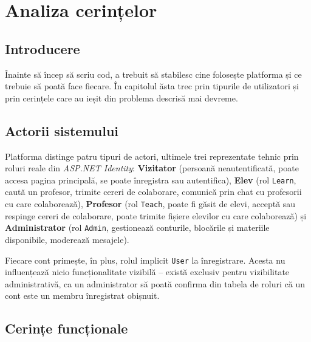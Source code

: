 \chapter{Analiza cerințelor}

\section{Introducere}

Înainte să încep să scriu cod, a trebuit să stabilesc cine folosește platforma și
ce trebuie să poată face fiecare. În capitolul ăsta trec prin tipurile de
utilizatori și prin cerințele care au ieșit din problema descrisă mai devreme.

\section{Actorii sistemului}

Platforma distinge patru tipuri de actori, ultimele trei reprezentate tehnic prin
roluri reale din \emph{ASP.NET Identity}: \textbf{Vizitator} (persoană
neautentificată, poate accesa pagina principală, se poate înregistra sau
autentifica), \textbf{Elev} (rol \texttt{Learn}, caută un profesor, trimite cereri
de colaborare, comunică prin chat cu profesorii cu care colaborează),
\textbf{Profesor} (rol \texttt{Teach}, poate fi găsit de elevi, acceptă sau
respinge cereri de colaborare, poate trimite fișiere elevilor cu care
colaborează) și \textbf{Administrator} (rol \texttt{Admin}, gestionează conturile,
blocările și materiile disponibile, moderează mesajele).

Fiecare cont primește, în plus, rolul implicit \texttt{User} la înregistrare.
Acesta nu influențează nicio funcționalitate vizibilă -- există exclusiv pentru
vizibilitate administrativă, ca un administrator să poată confirma din tabela de
roluri că un cont este un membru înregistrat obișnuit.

\section{Cerințe funcționale}

